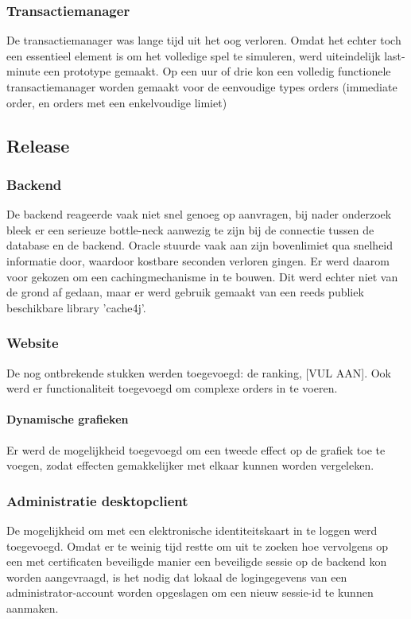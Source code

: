 \subsubsection{Transactiemanager}
De transactiemanager was lange tijd uit het oog verloren. Omdat het echter toch een essentieel element is om het volledige spel te simuleren, werd uiteindelijk last-minute een prototype gemaakt. Op een uur of drie kon een volledig functionele transactiemanager worden gemaakt voor de eenvoudige types orders (immediate order, en orders met een enkelvoudige limiet)


\subsection{Release}

\subsubsection{Backend}
De backend reageerde vaak niet snel genoeg op aanvragen, bij nader onderzoek bleek er een serieuze bottle-neck aanwezig te zijn bij de connectie tussen de database en de backend. Oracle stuurde vaak aan zijn bovenlimiet qua snelheid informatie door, waardoor kostbare seconden verloren gingen. Er werd daarom voor gekozen om een cachingmechanisme in te bouwen. Dit werd echter niet van de grond af gedaan, maar er werd gebruik gemaakt van een reeds publiek beschikbare library 'cache4j'.

\subsubsection{Website}
De nog ontbrekende stukken werden toegevoegd: de ranking, [VUL AAN]. Ook werd er functionaliteit toegevoegd om complexe orders in te voeren.
\paragraph{Dynamische grafieken}
Er werd de mogelijkheid toegevoegd om een tweede effect op de grafiek toe te voegen, zodat effecten gemakkelijker met elkaar kunnen worden vergeleken. 

\subsubsection{Administratie desktopclient}
De mogelijkheid om met een elektronische identiteitskaart in te loggen werd toegevoegd. Omdat er te weinig tijd restte om uit te zoeken hoe vervolgens op een met certificaten beveiligde manier een beveiligde sessie op de backend kon worden aangevraagd, is het nodig dat lokaal de logingegevens van een administrator-account worden opgeslagen om een nieuw sessie-id te kunnen aanmaken.


